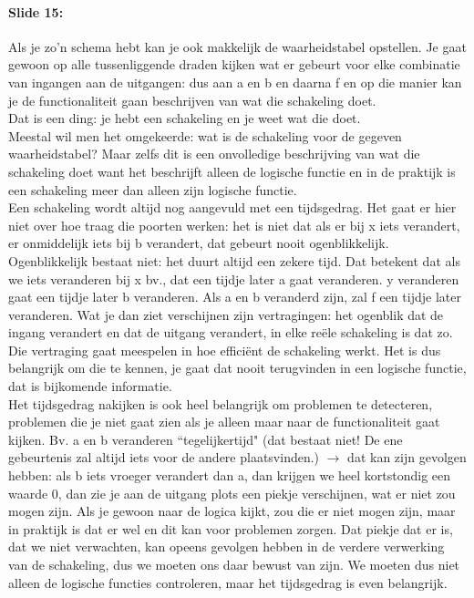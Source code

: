 \documentclass[10pt,a4paper]{book}
\begin{document}
\paragraph{Slide 15:} Als je zo'n schema hebt kan je ook makkelijk de waarheidstabel opstellen. Je gaat gewoon op alle tussenliggende draden kijken wat er gebeurt voor elke combinatie van ingangen aan de uitgangen: dus aan a en b en daarna f en op die manier kan je de functionaliteit gaan beschrijven van wat die schakeling doet. \\
Dat is een ding: je hebt een schakeling en je weet wat die doet. \\
Meestal wil men het omgekeerde: wat is de schakeling voor de gegeven waarheidstabel? Maar zelfs dit is een onvolledige beschrijving van wat die schakeling doet want het beschrijft alleen de logische functie en in de praktijk is een schakeling meer dan alleen zijn logische functie. \\
Een schakeling wordt altijd nog aangevuld met een tijdsgedrag. Het gaat er hier niet over hoe traag die poorten werken: het is niet dat als er bij x iets verandert, er onmiddelijk iets bij b verandert, dat gebeurt nooit ogenblikkelijk. Ogenblikkelijk bestaat niet: het duurt altijd een zekere tijd. Dat betekent dat als we iets veranderen bij x bv., dat een tijdje later a gaat veranderen. y veranderen gaat een tijdje later b veranderen. Als a en b veranderd zijn, zal f een tijdje later veranderen. Wat je dan ziet verschijnen zijn vertragingen: het ogenblik dat de ingang verandert en dat de uitgang verandert, in elke re\"ele schakeling is dat zo. Die vertraging gaat meespelen in hoe effici\"ent de schakeling werkt. Het is dus belangrijk om die te kennen, je gaat dat nooit terugvinden in een logische functie, dat is bijkomende informatie. \\
Het tijdsgedrag nakijken is ook heel belangrijk om problemen te detecteren, problemen die je niet gaat zien als je alleen maar naar de functionaliteit gaat kijken. Bv. a en b veranderen ``tegelijkertijd" (dat bestaat niet! De ene gebeurtenis zal altijd iets voor de andere plaatsvinden.) $\rightarrow$ dat kan zijn gevolgen hebben: als b iets vroeger verandert dan a, dan krijgen we heel kortstondig een waarde 0, dan zie je aan de uitgang plots een piekje verschijnen, wat er niet zou mogen zijn. Als je gewoon naar de logica kijkt, zou die er niet mogen zijn, maar in praktijk is dat er wel en dit kan voor problemen zorgen. Dat piekje dat er is, dat we niet verwachten, kan opeens gevolgen hebben in de verdere verwerking van de schakeling, dus we moeten ons daar bewust van zijn. We moeten dus niet alleen de logische functies controleren, maar het tijdsgedrag is even belangrijk. 
\end{document}
